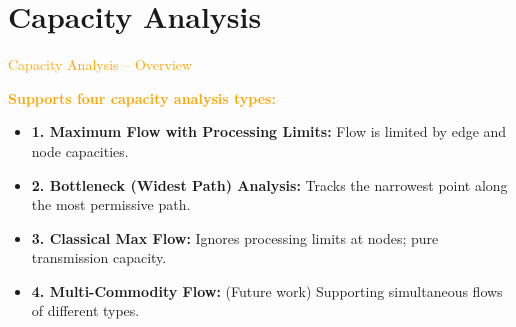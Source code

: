 \documentclass[aspectratio=169]{beamer}
\begin{document}
\section{Capacity Analysis}
\begin{frame}{\textcolor{orange}{Capacity Analysis – Overview}}



\vspace{0.4cm}
\textbf{\textcolor{orange}{Supports four capacity analysis types:}}

\vspace{0.3cm}
\begin{itemize}
    \item \textbf{1. Maximum Flow with Processing Limits:} Flow is limited by edge and node capacities.
    \item \textbf{2. Bottleneck (Widest Path) Analysis:} Tracks the narrowest point along the most permissive path.
    \item \textbf{3. Classical Max Flow:} Ignores processing limits at nodes; pure transmission capacity.
    \item \textbf{4. Multi-Commodity Flow: } (Future work) Supporting simultaneous flows of different types.
\end{itemize}


\end{frame}
\end{document}
